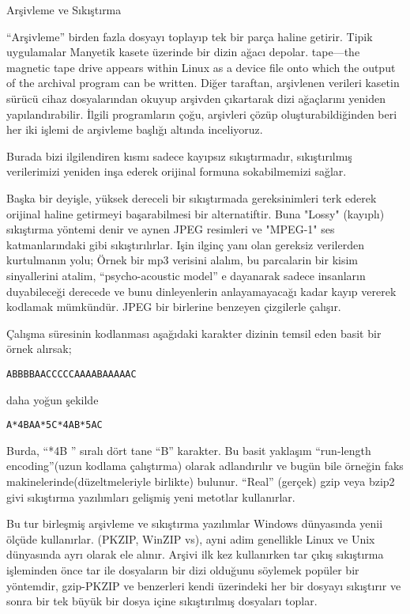 \documentclass[10pt,a5paper]{book}
\begin{document}
\begin{section}{Arşivleme ve Sıkıştırma}

“Arşivleme” birden fazla dosyayı toplayıp tek bir parça haline getirir. Tipik uygulamalar Manyetik kasete üzerinde bir dizin ağacı depolar. tape—the magnetic tape drive appears within Linux as a device file onto which the output of the archival program can be written. Diğer taraftan, arşivlenen verileri kasetin sürücü cihaz dosyalarından okuyup arşivden çıkartarak dizi ağaçlarını yeniden yapılandırabilir. İlgili programların çoğu, arşivleri
çözüp oluşturabildiğinden beri her iki işlemi de arşivleme başlığı altında inceliyoruz. 

Burada bizi ilgilendiren kısmı sadece kayıpsız sıkıştırmadır, sıkıştırılmış verilerimizi yeniden inşa ederek orijinal formuna sokabilmemizi sağlar.

Başka bir deyişle, yüksek dereceli bir sıkıştırmada gereksinimleri terk ederek orijinal haline getirmeyi başarabilmesi bir alternatiftir. Buna "Lossy" (kayıplı) sıkıştırma yöntemi denir  ve aynen JPEG resimleri ve "MPEG-1" ses katmanlarındaki gibi sıkıştırılırlar. Işin ilginç yanı olan gereksiz verilerden kurtulmanın yolu; Örnek bir mp3 verisini alalım, bu parcalarin bir kisim sinyallerini atalim, “psycho-acoustic model” e dayanarak sadece insanların duyabileceği derecede ve bunu dinleyenlerin anlayamayacağı kadar kayıp vererek kodlamak mümkündür. JPEG bir birlerine benzeyen çizgilerle çalışır.

Çalışma süresinin kodlanması aşağıdaki karakter dizinin temsil eden basit bir örnek alırsak;
\begin{verbatim}
ABBBBAACCCCCAAAABAAAAAC
\end{verbatim}

daha yoğun şekilde
\begin{verbatim}
A*4BAA*5C*4AB*5AC
\end{verbatim}

Burda, “*4B ” sıralı dört tane “B” karakter. Bu basit yaklaşım “run-length encoding”(uzun kodlama çalıştırma) olarak adlandırılır ve bugün bile örneğin faks makinelerinde(düzeltmeleriyle birlikte) bulunur. “Real” (gerçek) gzip veya bzip2 givi sıkıştırma yazılımları gelişmiş yeni metotlar kullanırlar.

Bu tur birleşmiş arşivleme ve sıkıştırma yazılımlar Windows dünyasında yenii ölçüde kullanırlar. (PKZIP, WinZIP vs), ayni adim genellikle Linux ve Unix dünyasında ayrı olarak ele alınır. Arşivi ilk kez kullanırken tar çıkış sıkıştırma işleminden önce tar ile dosyaların bir dizi olduğunu söylemek popüler bir yöntemdir, gzip-PKZIP ve benzerleri kendi üzerindeki her bir dosyayı sıkıştırır ve sonra bir tek büyük bir dosya içine sıkıştırılmış dosyaları toplar.


\end{section}
\end{document}
